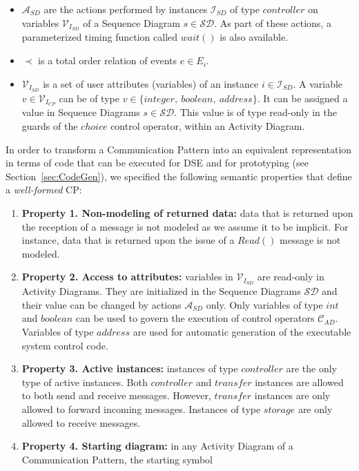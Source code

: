 \documentclass{llncs}
\begin{document}
\begin{subappendices}
\begin{itemize}
	\item $\mathcal{A}_{SD}$ are the actions performed by instances $\mathcal{I}_{SD}$ of type $controller$ on variables
	$\mathcal{V}_{{I}_{SD}}$ of a Sequence Diagram $s \in \mathcal{SD}$. As part of these actions, a parameterized timing function
	called $wait()$ is also available.
	\item $\prec$ is a total order relation of events $e \in E_i$.
	\item $\mathcal{V}_{{I}_{SD}}$ is a set of user attributes (variables) of an instance $i \in \mathcal{I}_{SD}$. A variable $v
	\in \mathcal{V}_{{I}_{CP}}$ can be of type $v \in \{integer,\ boolean,\ address\}$. It can be assigned a value in Sequence
	Diagrams $s \in \mathcal{SD}$. This value is of type read-only in the guards of the $choice$ control operator, within an Activity
	Diagram.
\end{itemize}
%
In order to transform a Communication Pattern into an equivalent representation in terms of code that can be executed
for DSE and for prototyping (see Section~\ref{sec:CodeGen}), we specified the following semantic properties that define
a \textit{well-formed} CP:
%
\begin{enumerate}
	\item \textbf{Property 1. Non-modeling of returned data:} data that is returned upon the reception of a message is
	not modeled as we assume it to be implicit. For instance, data that is returned upon the issue of a $Read()$ message
	is not modeled.
	\item \textbf{Property 2. Access to attributes:} variables in $\mathcal{V}_{{I}_{SD}}$ are read-only in Activity
	Diagrams. They are initialized in the Sequence Diagrams $\mathcal{SD}$ and their value can be changed by actions
	$\mathcal{A}_{SD}$ only. Only variables of type $int$ and $boolean$ can be used to govern the execution of control
	operators $\mathcal{C}_{AD}$. Variables of type $address$ are used for automatic generation of the executable system
	control code.
	\item \textbf{Property 3. Active instances:} instances of type $controller$ are the only type of active instances.
	Both $controller$ and $transfer$ instances are allowed to both send and receive messages. However, $transfer$
	instances are only allowed to forward incoming messages. Instances of type $storage$ are only allowed to receive
	messages.
	\item \textbf{Property 4. Starting diagram:} in any Activity Diagram of a Communication Pattern, the starting symbol

\end{enumerate}
\end{subappendices}
\end{document}
